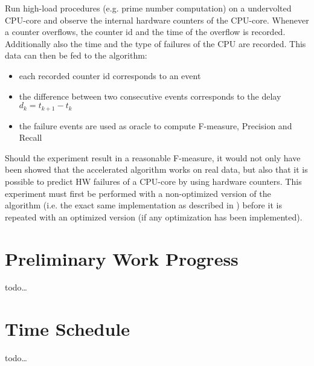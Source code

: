 \documentclass[12pt]{article} %
\begin{document}
Run high-load procedures (e.g. prime number computation) on a undervolted
CPU-core and observe the internal hardware counters of the CPU-core. Whenever
a counter overflows, the counter id and the time of the overflow is recorded.
Additionally also the time and the type of failures of the CPU are recorded.
This data can then be fed to the algorithm:
\begin{itemize}
    \item each recorded counter id corresponds to an event
    \item the difference between two consecutive events corresponds to the
        delay $ d_k = t_{k+1} - t_k $
    \item the failure events are used as oracle to compute F-measure, Precision
        and Recall
\end{itemize}
Should the experiment result in a reasonable F-measure, it would not only have
been showed that the accelerated algorithm works on real data, but also that it
is possible to predict HW failures of a CPU-core by using hardware counters.
This experiment must first be performed with a non-optimized version of the
algorithm (i.e. the exact same implementation as described in \cite{salfner08})
before it is repeated with an optimized version (if any optimization has been
implemented).


\section{Preliminary Work Progress} %
todo\dots


\section{Time Schedule} %
todo\dots


%



\end{document}
